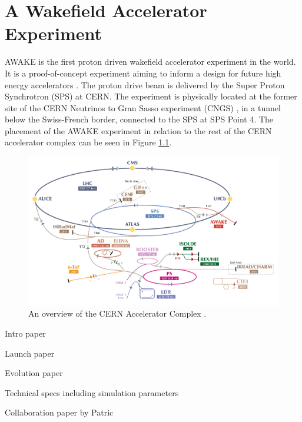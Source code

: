%
%

\chapter{A Wakefield Accelerator Experiment}
\label{Ch:WFA}

AWAKE is the first proton driven wakefield accelerator experiment in the world. It is a proof-of-concept experiment aiming to inform a design for future high energy accelerators \cite{gschwendtner:2016}. The proton drive beam is delivered by the Super Proton Synchrotron (SPS) at CERN. The experiment is physically located at the former site of the CERN Neutrinos to Gran Sasso experiment (CNGS) \cite{gschwendtner:2010}, in a tunnel below the Swiss-French border, connected to the SPS at SPS Point 4. The placement of the AWAKE experiment in relation to the rest of the CERN accelerator complex can be seen in Figure \ref{Fig:WFA:AccComp}.

\begin{figure}[hbt]
    \centering
    \includegraphics[width=0.99\linewidth,trim={20mm 0mm 20mm 0mm},clip]{figures/AcceleratorComplex}
    \caption{\label{Fig:WFA:AccComp} An overview of the CERN Accelerator Complex \cite{add:mobs:2016}.}
\end{figure}



Intro paper \cite{caldwell:2009}

Launch paper \cite{awake_collaboration:2014}

Evolution paper \cite{caldwell:2016}

Technical specs including simulation parameters \cite{gschwendtner:2016}

Collaboration paper by Patric \cite{muggli:2017a}

